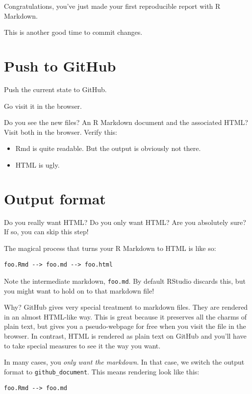 \documentclass[
]{book}
\providecommand{\tightlist}{%
  \setlength{\itemsep}{0pt}\setlength{\parskip}{0pt}}
\begin{document}
Congratulations, you've just made your first reproducible report with R Markdown.

This is another good time to commit changes.

\section{Push to GitHub}\label{push-to-github}

Push the current state to GitHub.

Go visit it in the browser.

Do you see the new files?
An R Markdown document and the associated HTML?
Visit both in the browser.
Verify this:

\begin{itemize}
\tightlist
\item
  Rmd is quite readable. But the output is obviously not there.
\item
  HTML is ugly.
\end{itemize}

\section{Output format}\label{output-format}

Do you really want HTML?
Do you only want HTML?
Are you absolutely sure?
If so, you can skip this step!

The magical process that turns your R Markdown to HTML is like so:

\begin{verbatim}
foo.Rmd --> foo.md --> foo.html
\end{verbatim}

Note the intermediate markdown, \texttt{foo.md}.
By default RStudio discards this, but you might want to hold on to that markdown file!

Why?
GitHub gives very special treatment to markdown files.
They are rendered in an almost HTML-like way.
This is great because it preserves all the charms of plain text, but gives you a pseudo-webpage for free when you visit the file in the browser.
In contrast, HTML is rendered as plain text on GitHub and you'll have to take special measures to see it the way you want.

In many cases, you \emph{only want the markdown}.
In that case, we switch the output format to \texttt{github\_document}.
This means rendering look like this:

\begin{verbatim}
foo.Rmd --> foo.md
\end{verbatim}
\end{document}
